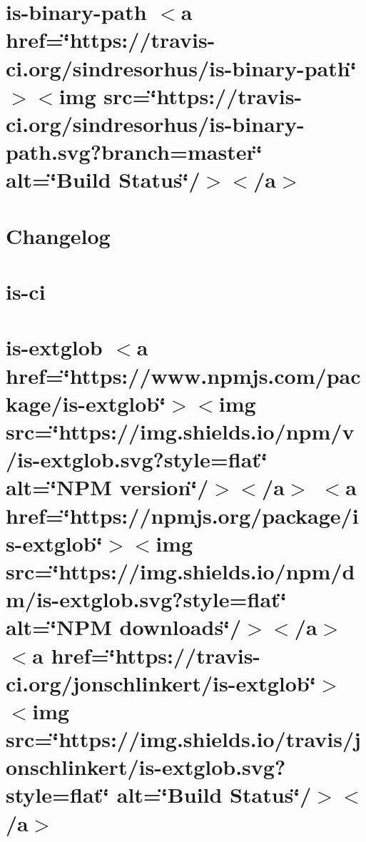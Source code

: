 \let\mypdfximage\pdfximage\def\pdfximage{\immediate\mypdfximage}\documentclass[twoside]{book}
\newcommand{\+}{\discretionary{\mbox{\scriptsize$\hookleftarrow$}}{}{}}
\begin{document}
\chapter{is-\/binary-\/path $<$a href=\char`\"{}https\+://travis-\/ci.\+org/sindresorhus/is-\/binary-\/path\char`\"{}$>$$<$img src=\char`\"{}https\+://travis-\/ci.\+org/sindresorhus/is-\/binary-\/path.\+svg?branch=master\char`\"{} alt=\char`\"{}\+Build Status\char`\"{}/$>$$<$/a$>$}
\label{md__c_1__git_hub__p_r_o_y_e_c_t_o-_i_i_i-_g_o_t_rest-api-node-mysql_node_modules_is-binary-path_readme}

\chapter{Changelog}
\label{md__c_1__git_hub__p_r_o_y_e_c_t_o-_i_i_i-_g_o_t_rest-api-node-mysql_node_modules_is-ci__c_h_a_n_g_e_l_o_g}

\chapter{is-\/ci}
\label{md__c_1__git_hub__p_r_o_y_e_c_t_o-_i_i_i-_g_o_t_rest-api-node-mysql_node_modules_is-ci__r_e_a_d_m_e}

\chapter{is-\/extglob $<$a href=\char`\"{}https\+://www.\+npmjs.\+com/package/is-\/extglob\char`\"{}$>$$<$img src=\char`\"{}https\+://img.\+shields.\+io/npm/v/is-\/extglob.\+svg?style=flat\char`\"{} alt=\char`\"{}\+N\+P\+M version\char`\"{}/$>$$<$/a$>$ $<$a href=\char`\"{}https\+://npmjs.\+org/package/is-\/extglob\char`\"{}$>$$<$img src=\char`\"{}https\+://img.\+shields.\+io/npm/dm/is-\/extglob.\+svg?style=flat\char`\"{} alt=\char`\"{}\+N\+P\+M downloads\char`\"{}/$>$$<$/a$>$ $<$a href=\char`\"{}https\+://travis-\/ci.\+org/jonschlinkert/is-\/extglob\char`\"{}$>$$<$img src=\char`\"{}https\+://img.\+shields.\+io/travis/jonschlinkert/is-\/extglob.\+svg?style=flat\char`\"{} alt=\char`\"{}\+Build Status\char`\"{}/$>$$<$/a$>$}
\label{md__c_1__git_hub__p_r_o_y_e_c_t_o-_i_i_i-_g_o_t_rest-api-node-mysql_node_modules_is-extglob__r_e_a_d_m_e}

\end{document}
